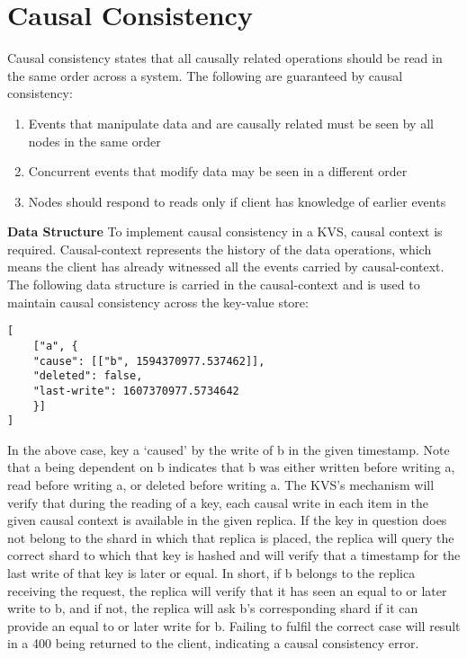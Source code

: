 \documentclass[12pt]{article}
\begin{document}
\section{Causal Consistency}
Causal consistency states that all causally related operations should be read in the same order across a system. The following are guaranteed by causal consistency:
\begin{enumerate}
	\item Events that manipulate data and are causally related must be seen by all nodes in the same order
	\item Concurrent events that modify data may be seen in a different order
	\item Nodes should respond to reads only if client has knowledge of earlier events

\end{enumerate}
\textbf{Data Structure}
\newline
To implement causal consistency in a KVS, causal context is required. Causal-context represents the history of the data operations, which means the client has already witnessed all the events carried by causal-context. The following data structure is carried in the causal-context and is used to maintain causal consistency across the key-value store: 
\begin{verbatim}
[
    ["a", {
    "cause": [["b", 1594370977.537462]],
    "deleted": false,
    "last-write": 1607370977.5734642
    }]
]
\end{verbatim}

In the above case, key a ‘caused’ by the write of b in the given timestamp. Note that a being dependent on b indicates that b was either written before writing a, read before writing a, or deleted before writing a. The KVS's mechanism will verify that during the reading of a key, each causal write in each item in the given causal context is available in the given replica. If the key in question does not belong to the shard in which that replica is placed, the replica will query the correct shard to which that key is hashed and will verify that a timestamp for the last write of that key is later or equal. In short, if b belongs to the replica receiving the request, the replica will verify that it has seen an equal to or later write to b, and if not, the replica will ask b's corresponding shard if it can provide an equal to or later write for b. Failing to fulfil the correct case will result in a 400 being returned to the client, indicating a causal consistency error.
\end{document}
